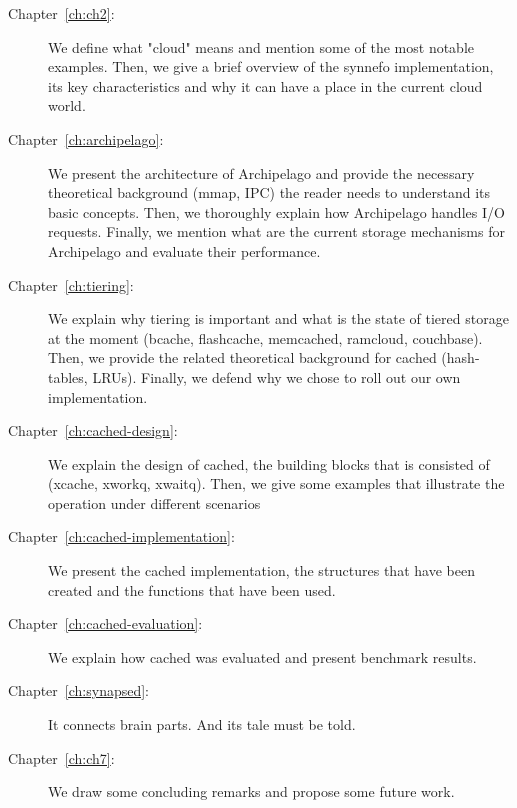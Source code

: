 \begin{description}
\item[Chapter~\ref{ch:ch2}:]
We define what "cloud" means and mention some of the most notable examples.
Then, we give a brief overview of the synnefo implementation, its key
characteristics and why it can have a place in the current cloud world.
\item[Chapter~\ref{ch:archipelago}:]
We present the architecture of Archipelago and provide the necessary theoretical
background (mmap, IPC) the reader needs to understand its basic concepts. Then,
we thoroughly explain how Archipelago handles I/O requests. Finally, we mention
what are the current storage mechanisms for Archipelago and evaluate their
performance.
\item[Chapter~\ref{ch:tiering}:]
We explain why tiering is important and what is the state of tiered storage at
the moment (bcache, flashcache, memcached, ramcloud, couchbase).  Then, we
provide the related theoretical background for cached (hash-tables, LRUs).
Finally, we defend why we chose to roll out our own implementation.
\item[Chapter~\ref{ch:cached-design}:]
We explain the design of cached, the building blocks that is consisted of
(xcache, xworkq, xwaitq). Then, we give some examples that illustrate the 
operation under different scenarios
\item[Chapter~\ref{ch:cached-implementation}:]
We present the cached implementation, the structures that have been created and 
the functions that have been used.
\item[Chapter~\ref{ch:cached-evaluation}:]
We explain how cached was evaluated and present benchmark results.
\item[Chapter~\ref{ch:synapsed}:]
It connects brain parts. And its tale must be told.
\item[Chapter~\ref{ch:ch7}:]
We draw some concluding remarks and propose some future work.
\end{description}
